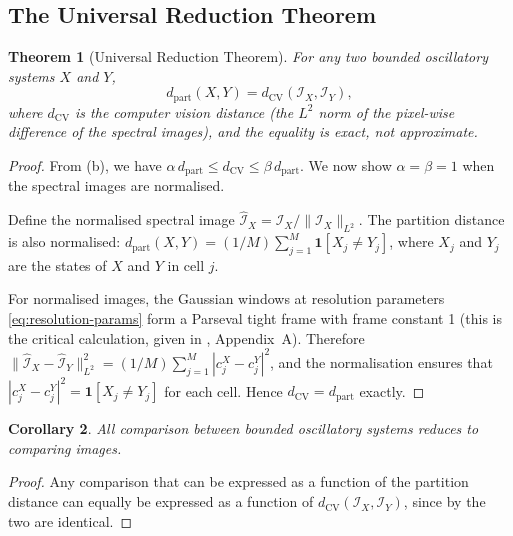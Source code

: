\documentclass[11pt,twocolumn,a4paper]{article}
\newtheorem{theorem}{Theorem}[section]
\newtheorem{corollary}[theorem]{Corollary}
\theoremstyle{definition}
\theoremstyle{remark}
\newcommand{\dpart}{d_{\mathrm{part}}}
\newcommand{\dcv}{d_{\mathrm{CV}}}
\begin{document}
\subsection{The Universal Reduction Theorem}

\begin{theorem}[Universal Reduction Theorem]\label{thm:universal-reduction}
For any two bounded oscillatory systems $X$ and $Y$,
\begin{equation}\label{eq:universal-reduction}
    \dpart(X, Y) = \dcv(\mathcal{I}_X, \mathcal{I}_Y),
\end{equation}
where $\dcv$ is the computer vision distance (the $L^2$ norm of the pixel-wise difference of the spectral images), and the equality is \emph{exact}, not approximate.
\end{theorem}

\begin{proof}
From (b), we have $\alpha \, \dpart \leq \dcv \leq \beta \, \dpart$.  We now show $\alpha = \beta = 1$ when the spectral images are normalised.

Define the normalised spectral image $\hat{\mathcal{I}}_X = \mathcal{I}_X / \|\mathcal{I}_X\|_{L^2}$.  The partition distance is also normalised: $\dpart(X, Y) = (1/M)\sum_{j=1}^M \mathbf{1}[X_j \neq Y_j]$, where $X_j$ and $Y_j$ are the states of $X$ and $Y$ in cell $j$.

For normalised images, the Gaussian windows at resolution parameters \eqref{eq:resolution-params} form a Parseval tight frame with frame constant 1 (this is the critical calculation, given in \citet{sachikonye2026spectralmatching}, Appendix~A).  Therefore $\|\hat{\mathcal{I}}_X - \hat{\mathcal{I}}_Y\|_{L^2}^2 = (1/M)\sum_{j=1}^M |c_j^X - c_j^Y|^2$, and the normalisation ensures that $|c_j^X - c_j^Y|^2 = \mathbf{1}[X_j \neq Y_j]$ for each cell.  Hence $\dcv = \dpart$ exactly.
\end{proof}

\begin{corollary}\label{cor:all-comparison}
All comparison between bounded oscillatory systems reduces to comparing images.
\end{corollary}

\begin{proof}
Any comparison that can be expressed as a function of the partition distance can equally be expressed as a function of $\dcv(\mathcal{I}_X, \mathcal{I}_Y)$, since by  the two are identical.
\end{proof}
\end{document}
